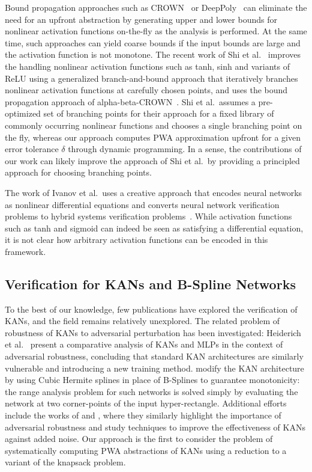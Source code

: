  Bound propagation approaches such as CROWN~\cite{zhang_weng_chen_hsieh_daniel_2018} or DeepPoly~\cite{Singh+Others/2019/Beyond} can eliminate the need for an upfront abstraction by generating upper and lower bounds for nonlinear activation functions on-the-fly as the analysis is performed. At the same time, such approaches can yield coarse bounds if the input bounds are large and the activation function is not monotone. The recent work of  Shi et al.~\cite{Shi+Others/2025/Neural} improves the handling nonlinear activation functions such as tanh, sinh and variants of ReLU using a generalized branch-and-bound approach that iteratively branches nonlinear activation functions at carefully chosen points, and uses the bound propagation approach of alpha-beta-CROWN~\cite{Wang+Others/2021/BetaCROWN}. Shi et al.\ assumes a pre-optimized set of branching points for their approach for a fixed library of commonly occurring nonlinear functions and chooses a single branching point on the fly, whereas our approach computes PWA approximation upfront for a given error tolerance $\delta$ through dynamic programming. In a sense, the contributions of our work can likely improve the approach of Shi et al.\ by providing a principled approach for choosing branching points.

 The work of Ivanov et al.\ uses a creative approach that encodes neural networks as nonlinear differential equations and converts neural network verification problems to hybrid systems verification problems~\cite{IvanovEtAl2019Verisig}. While activation functions such as tanh and sigmoid can indeed be seen as satisfying a differential equation, it is not clear how arbitrary activation functions can be encoded in this framework. 

\subsection{Verification for KANs and B-Spline Networks}
To the best of our knowledge, few publications have explored the verification of KANs, and the field remains relatively unexplored. The related problem of robustness of  KANs to adversarial perturbation has been investigated: Heiderich et al.~\cite{heiderich2025training} present a comparative analysis of KANs and MLPs in the context of adversarial robustness, concluding that standard KAN architectures are similarly vulnerable and introducing a new training method.
\cite{polomolina2024monokancertifiedmonotonickolmogorovarnold} modify the KAN architecture by using Cubic Hermite splines in place of B-Splines to guarantee monotonicity: the range analysis problem for such networks is solved simply by evaluating the network at two corner-points of the input hyper-rectangle.  Additional efforts include the works of \cite{shen2025reduced} and \cite{zeng2024kan}, where they similarly highlight the importance of adversarial robustness and study techniques to improve the effectiveness of KANs against added noise. Our approach is the first to consider the problem of systematically computing PWA abstractions of KANs using a reduction to a variant of the knapsack problem. 

